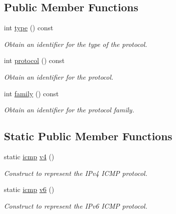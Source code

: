 \subsection*{Public Member Functions}
\begin{DoxyCompactItemize}
\item 
int \hyperlink{classasio_1_1ip_1_1icmp_a0514b883342ffbdcbed377ce87b62e36}{type} () const 
\begin{DoxyCompactList}\small\item\em Obtain an identifier for the type of the protocol. \end{DoxyCompactList}\item 
int \hyperlink{classasio_1_1ip_1_1icmp_a6f31f1b1a6596e35fe433a5b7aad5e98}{protocol} () const 
\begin{DoxyCompactList}\small\item\em Obtain an identifier for the protocol. \end{DoxyCompactList}\item 
int \hyperlink{classasio_1_1ip_1_1icmp_ad4d1df69e3630639c6d13d2c16b7dfba}{family} () const 
\begin{DoxyCompactList}\small\item\em Obtain an identifier for the protocol family. \end{DoxyCompactList}\end{DoxyCompactItemize}
\subsection*{Static Public Member Functions}
\begin{DoxyCompactItemize}
\item 
static \hyperlink{classasio_1_1ip_1_1icmp}{icmp} \hyperlink{classasio_1_1ip_1_1icmp_a7545d246fedc3b70c3b42c95840d40eb}{v4} ()
\begin{DoxyCompactList}\small\item\em Construct to represent the I\+Pv4 I\+C\+M\+P protocol. \end{DoxyCompactList}\item 
static \hyperlink{classasio_1_1ip_1_1icmp}{icmp} \hyperlink{classasio_1_1ip_1_1icmp_add63845bd330aa8ae9264ff9e5c0c1a7}{v6} ()
\begin{DoxyCompactList}\small\item\em Construct to represent the I\+Pv6 I\+C\+M\+P protocol. \end{DoxyCompactList}\end{DoxyCompactItemize}
